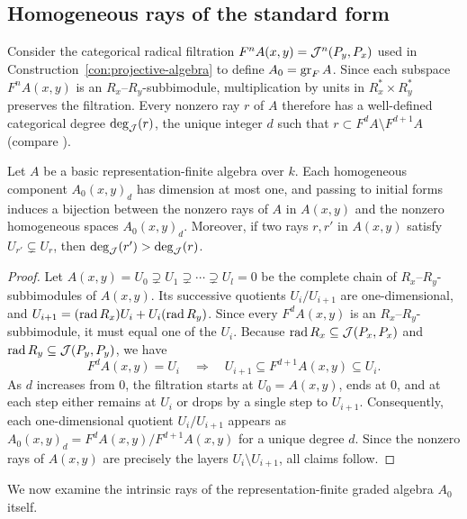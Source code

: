 \subsection{Homogeneous rays of the standard form}

Consider the categorical radical filtration $F^n A(x,y)=\mathcal J^n(P_y,P_x)$ used
in Construction~\ref{con:projective-algebra} to define $A_0=\operatorname{gr}_F A$. Since
each subspace $F^n A(x,y)$ is an $R_x$--$R_y$-subbimodule, multiplication by
units in $R_x^*\times R_y^*$ preserves the filtration. Every nonzero ray $r$
of $A$ therefore has a well-defined categorical degree $\deg_\mathcal J(r)$, the
unique integer $d$ such that $r\subset F^d A\setminus F^{d+1}A$ (compare
\cite[Section~1.1]{BretscherGabriel}).

\begin{lemma}
\label{lem:ray-degree}
Let $A$ be a basic representation-finite algebra over $k$. Each homogeneous
component $A_0(x,y)_d$ has dimension at most one, and passing to initial
forms induces a bijection between the nonzero rays of $A$ in $A(x,y)$ and
the nonzero homogeneous spaces $A_0(x,y)_d$. Moreover, if two rays $r,r'$ in
$A(x,y)$ satisfy $U_{r'}\subsetneq U_r$, then $\deg_\mathcal J(r')>\deg_\mathcal J(r)$.
\end{lemma}
\begin{proof}
Let $A(x,y)=U_0\supsetneq U_1\supsetneq\cdots\supsetneq U_l=0$ be the
complete chain of $R_x$--$R_y$-subbimodules of $A(x,y)$. Its successive
quotients $U_i/U_{i+1}$ are one-dimensional, and
$U_{i+1}=(\operatorname{rad} R_x)U_i+U_i(\operatorname{rad} R_y)$. Since every $F^d A(x,y)$ is an
$R_x$--$R_y$-subbimodule, it must equal one of the $U_i$. Because
$\operatorname{rad} R_x\subseteq \mathcal J(P_x,P_x)$ and $\operatorname{rad} R_y\subseteq \mathcal J(P_y,P_y)$, we have
\[
 F^d A(x,y)=U_i\quad\Longrightarrow\quad
 U_{i+1}\subseteq F^{d+1}A(x,y)\subseteq U_i.
\]
As $d$ increases from $0$, the filtration starts at $U_0=A(x,y)$, ends at
$0$, and at each step either remains at $U_i$ or drops by a single step to
$U_{i+1}$. Consequently, each one-dimensional quotient $U_i/U_{i+1}$ appears
as $A_0(x,y)_d=F^d A(x,y)/F^{d+1}A(x,y)$ for a unique degree $d$. Since the
nonzero rays of $A(x,y)$ are precisely the layers $U_i\setminus U_{i+1}$,
all claims follow.
\end{proof}

We now examine the intrinsic rays of the representation-finite graded
algebra $A_0$ itself.

